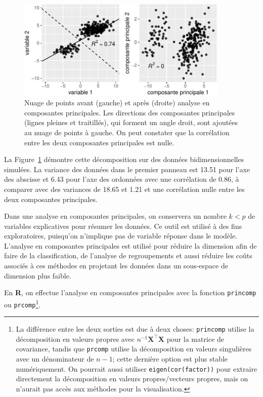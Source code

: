 \documentclass[
  11pt,
  letterpaper,
]{scrbook}
\theoremstyle{definition}
\theoremstyle{remark}
\begin{document}
\begin{figure}[ht!]

{\centering \includegraphics[width=0.9\textwidth,height=\textheight]{./02-analysefactorielle_files/figure-pdf/fig-acprotation-1.pdf}

}

\caption{\label{fig-acprotation}Nuage de points avant (gauche) et après
(droite) analyse en composantes principales. Les directions des
composantes principales (lignes pleines et traitillés), qui forment un
angle droit, sont ajoutées au nuage de points à gauche. On peut
constater que la corrélation entre les deux composantes principales est
nulle.}

\end{figure}

La Figure~\ref{fig-acprotation} démontre cette décomposition sur des
données bidimensionnelles simulées. La variance des données dans le
premier panneau est 13.51 pour l'axe des abscisse et 6.43 pour l'axe des
ordonnées avec une corrélation de 0.86, à comparer avec des variances de
18.65 et 1.21 et une corrélation nulle entre les deux composantes
principales.

Dans une analyse en composantes principales, on conservera un nombre
\(k<p\) de variables explicatives pour résumer les données. Ce outil est
utilisé à des fins exploratoires, puisqu'on n'implique pas de variable
réponse dans le modèle. L'analyse en composantes principales est utilisé
pour réduire la dimension afin de faire de la classification, de
l'analyse de regroupements et aussi réduire les coûts associés à ces
méthodes en projetant les données dans un sous-espace de dimension plus
faible.

En \textbf{R}, on effectue l'analyse en composantes principales avec la
fonction \texttt{princomp} ou \texttt{prcomp}\footnote{La différence
  entre les deux sorties est due à deux choses: \texttt{princomp}
  utilise la décomposition en valeurs propres avec
  \(n^{-1}\mathbf{X}^\top\mathbf{X}\) pour la matrice de covariance,
  tandis que \texttt{prcomp} utilise la décomposition en valeurs
  singulières avec un dénominateur de \(n-1\); cette dernière option est
  plus stable numériquement. On pourrait aussi utiliser
  \texttt{eigen(cor(factor))} pour extraire directement la décomposition
  en valeurs propres/vecteurs propres, mais on n'aurait pas accès aux
  méthodes pour la visualisation.}.
\end{document}

